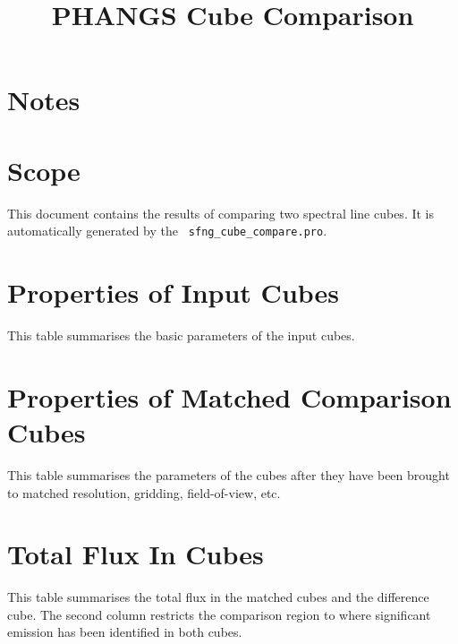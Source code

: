 \documentclass[11pt]{article}
\begin{document}
\title{PHANGS Cube Comparison}

\maketitle


\section{Notes}
\label{sect:notes}


\section{Scope}
\label{sec:scope}

\noindent  This document contains the results of comparing two spectral line
cubes. It is automatically generated by the {\tt
  sfng\_cube\_compare.pro}.

\section{Properties of Input Cubes}
\label{sect:input_cubes}
\noindent This table summarises the basic parameters of the input cubes.


\section{Properties of Matched Comparison Cubes}
\label{sect:match_cubes}
\noindent This table summarises the parameters of the cubes after they have been brought to matched resolution, gridding, field-of-view, etc.


\section{Total Flux In Cubes}
\label{sect:totflux}
\noindent  This table summarises the total flux in the matched cubes and the
difference cube. The second column restricts the comparison region to
where significant emission has been identified in both cubes.

\end{document}
